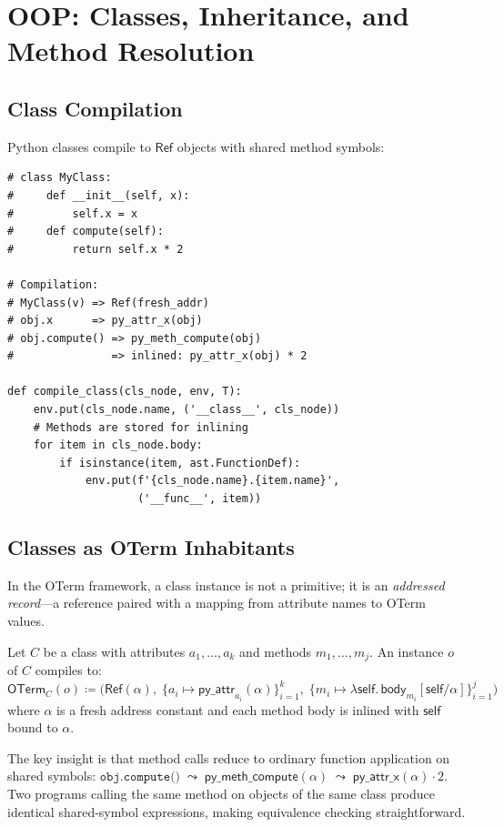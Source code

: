 \chapter{OOP: Classes, Inheritance, and Method Resolution}
\label{ch:oop}

\section{Class Compilation}

Python classes compile to $\mathsf{Ref}$ objects with shared method
symbols:

\begin{lstlisting}[caption={Class compilation}]
# class MyClass:
#     def __init__(self, x):
#         self.x = x
#     def compute(self):
#         return self.x * 2

# Compilation:
# MyClass(v) => Ref(fresh_addr)
# obj.x      => py_attr_x(obj)
# obj.compute() => py_meth_compute(obj)
#               => inlined: py_attr_x(obj) * 2

def compile_class(cls_node, env, T):
    env.put(cls_node.name, ('__class__', cls_node))
    # Methods are stored for inlining
    for item in cls_node.body:
        if isinstance(item, ast.FunctionDef):
            env.put(f'{cls_node.name}.{item.name}',
                    ('__func__', item))
\end{lstlisting}

\section{Classes as OTerm Inhabitants}

In the OTerm framework, a class instance is not a primitive; it is
an \emph{addressed record}---a reference paired with a mapping from
attribute names to OTerm values.

\begin{definition}
Let $C$ be a class with attributes $a_1, \ldots, a_k$ and methods
$m_1, \ldots, m_j$.  An instance $o$ of $C$ compiles to:
\[
  \mathsf{OTerm}_C(o) \coloneqq \bigl(\mathsf{Ref}(\alpha),\;
    \{a_i \mapsto \mathsf{py\_attr}_{a_i}(\alpha)\}_{i=1}^k,\;
    \{m_i \mapsto \lambda \mathsf{self}.\, \mathsf{body}_{m_i}[\mathsf{self}/\alpha]\}_{i=1}^j
  \bigr)
\]
where $\alpha$ is a fresh address constant and each method body is
inlined with $\mathsf{self}$ bound to $\alpha$.
\end{definition}

The key insight is that method calls reduce to ordinary function
application on shared symbols:
$\texttt{obj.compute()} \;\leadsto\; \mathsf{py\_meth\_compute}(\alpha)
  \;\leadsto\; \mathsf{py\_attr\_x}(\alpha) \cdot 2$.
Two programs calling the same method on objects of the same class
produce identical shared-symbol expressions, making equivalence
checking straightforward.

